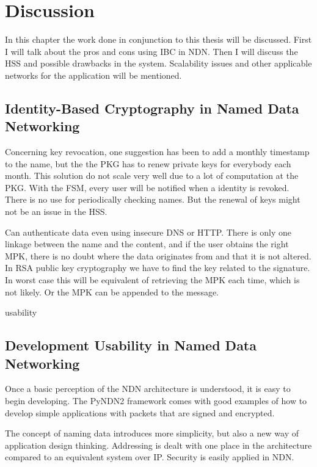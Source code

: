 \chapter{Discussion}
In this chapter the work done in conjunction to this thesis will be discussed. 
First I will talk about the pros and cons using \gls{IBC} in \gls{NDN}.
Then I will discuss the \gls{HSS} and possible drawbacks in the system. 
Scalability issues and other applicable networks for the application will be mentioned.

\section{Identity-Based Cryptography in Named Data Networking}
Concerning key revocation, one suggestion has been to add a monthly timestamp to the \gls{name}, but the the \gls{PKG} has to renew private keys for everybody each month. 
This solution do not scale very well due to a lot of computation at the \gls{PKG}.
With the \gls{FSM}, every user will be notified when a identity is revoked.
There is no use for periodically checking names.
But the renewal of keys might not be an issue in the \gls{HSS}. 

Can authenticate \gls{data} even using insecure DNS or HTTP. 
There is only one linkage between the \gls{name} and the content, and if the user obtains the right \gls{MPK}, there is no doubt where the \gls{data} originates from and that it is not altered.
In RSA public key cryptography we have to find the key related to the signature. 
In worst case this will be equivalent of retrieving the \gls{MPK} each time, which is not likely. 
Or the \gls{MPK} can be appended to the message.

usability 



\section{Development Usability in Named Data Networking}
Once a basic perception of the \gls{NDN} architecture is understood, it is easy to begin developing.
The \gls{PyNDN2} framework comes with good examples of how to develop simple applications with packets that are signed and encrypted.

The concept of naming \gls{data} introduces more simplicity, but also a new way of application design thinking.
Addressing is dealt with one place in the architecture compared to an equivalent system over \gls{IP}. 
Security is easily applied in \gls{NDN}.

